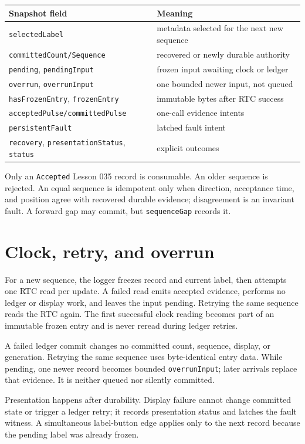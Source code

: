 \documentclass[11pt]{article}
\begin{document}
\begin{tabularx}{\linewidth}{@{}l X@{}}
\toprule
Snapshot field & Meaning\\
\midrule
\texttt{selectedLabel} & metadata selected for the next new sequence\\
\texttt{committedCount/Sequence} & recovered or newly durable authority\\
\texttt{pending}, \texttt{pendingInput} & frozen input awaiting clock or ledger\\
\texttt{overrun}, \texttt{overrunInput} & one bounded newer input, not queued\\
\texttt{hasFrozenEntry}, \texttt{frozenEntry} & immutable bytes after RTC success\\
\texttt{acceptedPulse/committedPulse} & one-call evidence intents\\
\texttt{persistentFault} & latched fault intent\\
\texttt{recovery}, \texttt{presentationStatus}, \texttt{status} & explicit outcomes\\
\bottomrule
\end{tabularx}

Only an \texttt{Accepted} Lesson 035 record is consumable. An older sequence is
rejected. An equal sequence is idempotent only when direction, acceptance time,
and position agree with recovered durable evidence; disagreement is an
invariant fault. A forward gap may commit, but \texttt{sequenceGap} records it.

\section{Clock, retry, and overrun}
For a new sequence, the logger freezes record and current label, then attempts
one RTC read per update. A failed read emits accepted evidence, performs no
ledger or display work, and leaves the input pending. Retrying the same
sequence reads the RTC again. The first successful clock reading becomes part
of an immutable frozen entry and is never reread during ledger retries.

A failed ledger commit changes no committed count, sequence, display, or
generation. Retrying the same sequence uses byte-identical entry data. While
pending, one newer record becomes bounded \texttt{overrunInput}; later arrivals
replace that evidence. It is neither queued nor silently committed.

Presentation happens after durability. Display failure cannot change committed
state or trigger a ledger retry; it records presentation status and latches the
fault witness. A simultaneous label-button edge applies only to the next
record because the pending label was already frozen.
\end{document}
